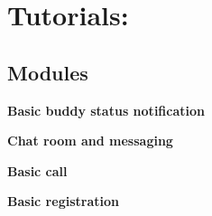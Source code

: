 \section{\-Tutorials\-:}
\label{group__tutorials}
\subsection*{\-Modules}
\begin{DoxyCompactItemize}
\item 
{\bf \-Basic buddy status notification}
\item 
{\bf \-Chat room and messaging}
\item 
{\bf \-Basic call}
\item 
{\bf \-Basic registration}
\end{DoxyCompactItemize}
